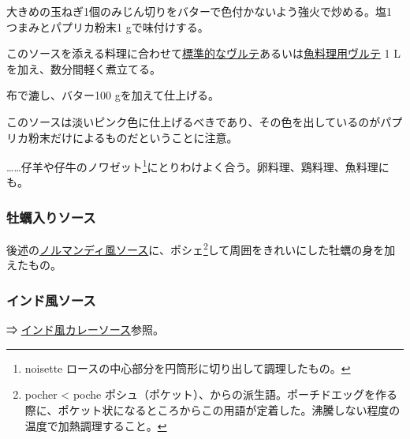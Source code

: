 \begin{recette}
大きめの玉ねぎ1個のみじん切りをバターで色付かないよう強火で炒める。塩1
つまみとパプリカ粉末1 gで味付けする。

このソースを添える料理に合わせて\protect\hyperlink{veloute}{標準的なヴルテ}あるいは\protect\hyperlink{veloute-de-poisson}{魚料理用ヴルテ}
1 Lを加え、数分間軽く煮立てる。

布で漉し、バター100 gを加えて仕上げる。

このソースは淡いピンク色に仕上げるべきであり、その色を出しているのがパプリカ粉末だけによるものだということに注意。

\ldots{}\ldots{}仔羊や仔牛のノワゼット\footnote{noisette
  ロースの中心部分を円筒形に切り出して調理したもの。}にとりわけよく合う。卵料理、鶏料理、魚料理にも。

\atoaki{}

\hypertarget{sauce-aux-huitres}{%
\subsubsection{牡蠣入りソース}\label{sauce-aux-huitres}}


 

後述の\protect\hyperlink{sauce-normande}{ノルマンディ風ソース}に、ポシェ\footnote{pocher
  \textless{} poche
  ポシュ（ポケット）、からの派生語。ポーチドエッグを作る際に、ポケット状になるところからこの用語が定着した。沸騰しない程度の温度で加熱調理すること。}して周囲をきれいにした牡蠣の身を加えたもの。

\atoaki{}

\hypertarget{sauceindienne}{%
\subsubsection{インド風ソース}\label{sauceindienne}}


 

⇒ \protect\hyperlink{sauce-currie-indienne}{インド風カレーソース}参照。


\end{recette}
